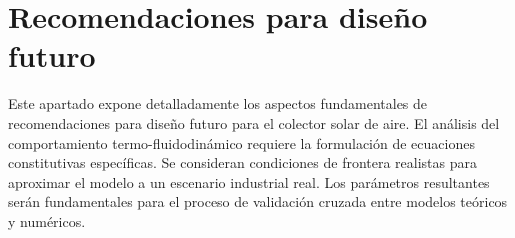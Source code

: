 \section{Recomendaciones para diseño futuro}
\label{sec:cap10_recomendaciones_diseno}

Este apartado expone detalladamente los aspectos fundamentales de recomendaciones para diseño futuro para el colector solar de aire.
El análisis del comportamiento termo-fluidodinámico requiere la formulación de ecuaciones constitutivas específicas.
Se consideran condiciones de frontera realistas para aproximar el modelo a un escenario industrial real.
Los parámetros resultantes serán fundamentales para el proceso de validación cruzada entre modelos teóricos y numéricos.
